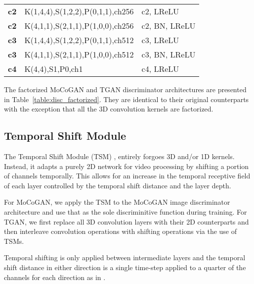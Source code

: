 \documentclass[a4paper,fleqn]{cas-sc}
\begin{document}
\begin{table}[width=\linewidth,cols=7,pos=!h]
\begin{subtable}{.5\linewidth}
\begin{tabular*}{0.98\linewidth}{@{} LLL@{} }
        \textbf{c2}  & K(1,4,4),S(1,2,2),P(0,1,1),ch256     & c2, LReLU            \\ 
\textbf{c2}    & K(4,1,1),S(2,1,1),P(1,0,0),ch256     & c2, BN, LReLU          \\
        
        \hline
        \textbf{c3}  & K(1,4,4),S(1,2,2),P(0,1,1),ch512     & c3, LReLU            \\ 
\textbf{c3}    & K(4,1,1),S(2,1,1),P(1,0,0),ch512     & c3, BN, LReLU    \\
        
        \hline
        \textbf{c4}  & K(4,4),S1,P0,ch1                     & c4, LReLU            \\ 
\hline \end{tabular*}
\end{subtable}
\end{table}

The factorized MoCoGAN and TGAN discriminator architectures are presented in Table~\ref{table:disc_factorized}. They are identical to their original counterparts with the exception that all the 3D convolution kernels are factorized. 


\subsection{Temporal Shift Module}
The Temporal Shift Module (TSM) \cite{linGHtsm}, entirely forgoes 3D and/or 1D kernels. Instead, it adapts a purely 2D network for video processing by shifting a portion of channels temporally. This allows for an increase in the temporal receptive field of each layer controlled by the temporal shift distance and the layer depth. 

For MoCoGAN, we apply the TSM to the MoCoGAN image discriminator architecture and use that as the sole discriminitive function during training. For TGAN, we first replace all 3D convolution layers with their 2D counterparts and then interleave convolution operations with shifting operations via the use of TSMs.

Temporal shifting is only applied between intermediate layers and the temporal shift distance in either direction is a single time-step applied to a quarter of the channels for each direction as in \cite{linGHtsm}.
\end{document}
